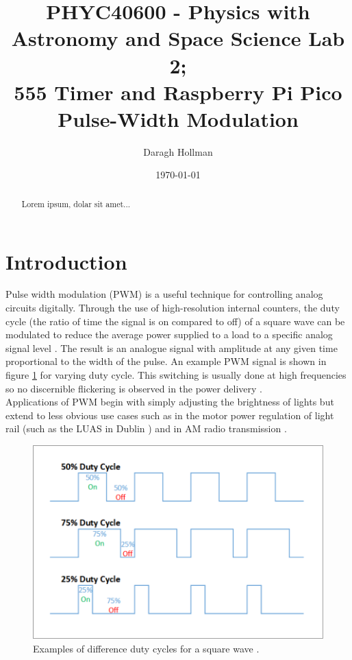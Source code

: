 \documentclass[%
 reprint,
 amsmath,amssymb,
 aps,
]{revtex4-2}
\begin{document}

\title{PHYC40600 - Physics with Astronomy and Space Science Lab 2;\\\vspace{1cm}555 Timer and Raspberry Pi Pico Pulse-Width Modulation}

\author{Daragh Hollman}
%

\date{\today}%

\begin{abstract}
    Lorem ipsum, dolar sit amet...
\end{abstract}

\maketitle

\section{Introduction}

    Pulse width modulation (PWM) is a useful technique for controlling analog circuits digitally. Through the use of high-resolution internal counters, the duty cycle (the ratio of time the signal is on compared to off) of a square wave can be modulated to reduce the average power supplied to a load to a specific analog signal level \cite{barr}. The result is an analogue signal with amplitude at any given time proportional to the width of the pulse. An example PWM signal is shown in figure \ref{fig:PWM} for varying duty cycle. This switching is usually done at high frequencies so no discernible flickering is observed in the power delivery \cite{ucd}.\\

    Applications of PWM begin with simply adjusting the brightness of lights but extend to less obvious use cases such as in the motor power regulation of light rail (such as the LUAS in Dublin \cite{ucd}) and in AM radio transmission \cite{radioworld}.\\

    \begin{figure}
        \includegraphics[width=0.9\columnwidth]{Images/pwm.png}
        \caption{\label{fig:PWM}Examples of difference duty cycles for a square wave \cite{ucd}.}
    \end{figure}
\end{document}
